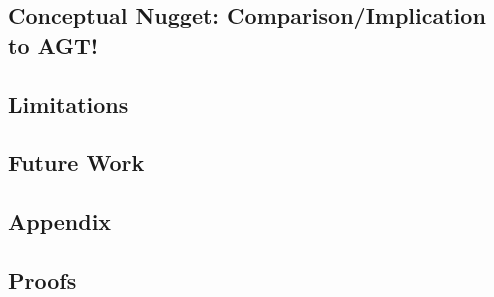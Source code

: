 \section{Conceptual Nugget: Comparison/Implication to AGT!}

\section{Limitations}
\label{sec:limitations}


\section{Future Work}
\label{sec:future-work}


\begin{appendices}
\chapter{Appendix}

\section{Proofs}
\label{sec:proofs}


\end{appendices}

\begin{comment}
\chapter{UNSORTED}

\section{NPC formula}
\label{sec:npc-formula}

\end{comment}